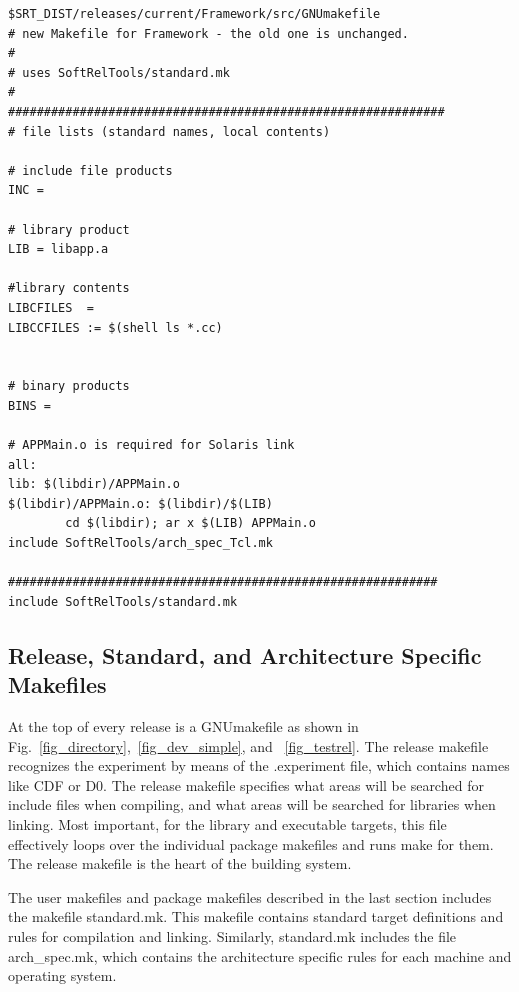 \begin{footnotesize}
\begin{verbatim}
$SRT_DIST/releases/current/Framework/src/GNUmakefile 
# new Makefile for Framework - the old one is unchanged.
#
# uses SoftRelTools/standard.mk
#
#############################################################
# file lists (standard names, local contents)

# include file products
INC =

# library product
LIB = libapp.a

#library contents
LIBCFILES  =
LIBCCFILES := $(shell ls *.cc)


# binary products
BINS =

# APPMain.o is required for Solaris link
all:
lib: $(libdir)/APPMain.o
$(libdir)/APPMain.o: $(libdir)/$(LIB)
        cd $(libdir); ar x $(LIB) APPMain.o
include SoftRelTools/arch_spec_Tcl.mk

############################################################
include SoftRelTools/standard.mk
\end{verbatim}
\end{footnotesize}


\subsection{Release, Standard, and Architecture Specific Makefiles}
\label{app_release_make}
At the top of every release is a GNUmakefile as shown in 
Fig.~\ref{fig_directory},~\ref{fig_dev_simple}, and ~\ref{fig_testrel}. The 
release makefile recognizes the experiment by 
means of the .experiment file, which contains names like CDF or D0. The release
makefile specifies what areas will be searched for include files when
compiling, and what areas will be searched for libraries when linking.
Most important, for the library and executable targets, this file effectively 
loops over the individual package makefiles and runs make for them.
The release makefile is the heart of the building system.

The user makefiles and package makefiles described in the last section
includes the makefile standard.mk.  This makefile contains standard target 
definitions and rules for compilation and linking.  Similarly, standard.mk
includes the file arch\_spec.mk, which contains the architecture specific
rules for each machine and operating system.
\clearpage

